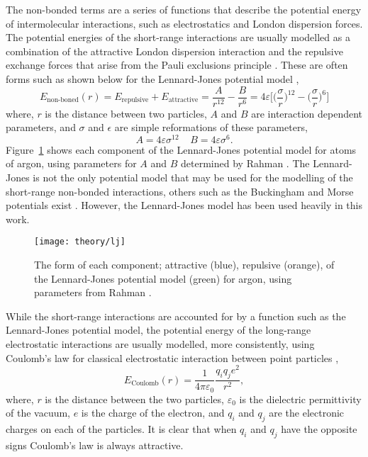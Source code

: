 The non-bonded terms are a series of functions that describe the potential energy of intermolecular interactions, such as electrostatics and London dispersion forces.
The potential energies of the short-range interactions are usually modelled as a combination of the attractive London dispersion interaction and the repulsive exchange forces that arise from the Pauli exclusions principle \cite{leach_molecular_1996}.
These are often forms such as shown below for the Lennard-Jones potential model \cite{lennard-jones_determination_1924},
%
\begin{equation}
  E_{\text{non-boned}}(r) = E_{\text{repulsive}} + E_{\text{attractive}} = \frac{A}{r^{12}} - \frac{B}{r^6} = 4\varepsilon\Bigg[\bigg(\frac{\sigma}{r}\bigg)^{12} - \bigg(\frac{\sigma}{r}\bigg)^6\Bigg]
\end{equation}
%
where, $r$ is the distance between two particles, $A$ and $B$ are interaction dependent parameters, and $\sigma$ and $\epsilon$ are simple reformations of these parameters,
%
\begin{equation}
  A = 4\varepsilon\sigma^{12} \;\;\;\; B = 4\varepsilon\sigma^6.
\end{equation}
%
Figure~\ref{fig:lj} shows each component of the Lennard-Jones potential model for atoms of argon, using parameters for $A$ and $B$ determined by Rahman \cite{rahman_correlations_1964}.
The Lennard-Jones is not the only potential model that may be used for the modelling of the short-range non-bonded interactions, others such as the Buckingham and Morse potentials exist \cite{buckingham_classical_1938, morse_diatomic_1929}.
However, the Lennard-Jones model has been used heavily in this work.
%
\begin{figure}
    \centering
    \texttt{[image: theory/lj]}
    \caption{The form of each component; attractive (blue), repulsive (orange), of the Lennard-Jones potential model (green) for argon, using parameters from Rahman \cite{rahman_correlations_1964}.}
    \label{fig:lj}
\end{figure}
%

While the short-range interactions are accounted for by a function such as the Lennard-Jones potential model, the potential energy of the long-range electrostatic interactions are usually modelled, more consistently, using Coulomb's law for classical electrostatic interaction between point particles \cite{coulomb_premier_1788, coulomb_second_1788},
%
\begin{equation}
  E_{\text{Coulomb}}(r) = \frac{1}{4\pi\varepsilon_0}{\frac{q_iq_je^2}{r^2}},
\end{equation}
%
where, $r$ is the distance between the two particles, $\varepsilon_0$ is the dielectric permittivity of the vacuum, $e$ is the charge of the electron, and $q_i$ and $q_j$ are the electronic charges on each of the particles.
It is clear that when $q_i$ and $q_j$ have the opposite signs Coulomb's law is always attractive.


